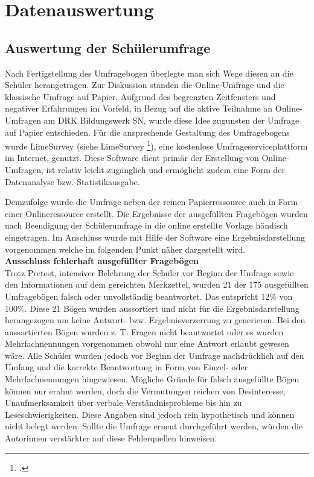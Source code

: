 \section{Datenauswertung}
\label{sec:Datenauswertung}

\subsection{Auswertung der Schülerumfrage}
\label{sec:AuswertungDerSchülerumfrage}

Nach Fertigstellung des Umfragebogen überlegte man sich Wege diesen an die Schüler herangetragen. Zur Diskussion standen die Online-Umfrage und die klassische Umfrage auf Papier. Aufgrund des begrenzten Zeitfensters und negativer Erfahrungen im Vorfeld, in Bezug auf die aktive Teilnahme an Online-Umfragen am DRK Bildungswerk SN, wurde diese Idee zugunsten der Umfrage auf Papier entschieden. Für die ansprechende Gestaltung des Umfragebogens wurde LimeSurvey (siehe LimeSurvey \footcite {LimeSurvey2015}), eine kostenlose Umfrageserviceplattform im Internet, genutzt. Diese Software dient primär der Erstellung von Online-Umfragen, ist relativ leicht zugänglich und ermöglicht zudem eine Form der Datenanalyse bzw. Statistikausgabe.

Demzufolge wurde die Umfrage neben der reinen Papierressource auch in Form einer Onlineressource erstellt. Die Ergebnisse der ausgefüllten Fragebögen wurden nach Beendigung der Schülerumfrage in die online erstellte Vorlage händisch eingetragen. Im Anschluss wurde mit Hilfe der Software eine Ergebnisdarstellung vorgenommen welche im folgenden Punkt näher dargestellt wird.\\

\noindent
\textbf{Ausschluss fehlerhaft ausgefüllter Fragebögen}\\

\noindent
Trotz Pretest, intensiver Belehrung der Schüler vor Beginn der Umfrage sowie den Informationen auf dem gereichten Merkzettel, wurden 21 der 175 ausgefüllten Umfragebögen falsch oder unvollständig beantwortet. Das entspricht 12\% von 100\%. Diese 21 Bögen wurden aussortiert und nicht für die Ergebnisdarstellung herangezogen um keine Antwort- bzw. Ergebnisverzerrung zu generieren. Bei den aussortierten Bögen wurden z. T. Fragen nicht beantwortet oder es wurden Mehrfachnennungen vorgenommen obwohl nur eine Antwort erlaubt gewesen wäre. Alle Schüler wurden jedoch vor Beginn der Umfrage nachdrücklich auf den Umfang und die korrekte Beantwortung in Form von Einzel- oder Mehrfachnennungen hingewiesen. Mögliche Gründe für falsch ausgefüllte Bögen können nur erahnt werden, doch die Vermutungen reichen von Desinteresse, Unaufmerksamkeit über verbale Verständnisprobleme bis hin zu Leseschwierigkeiten. Diese Angaben sind jedoch rein hypothetisch und können nicht belegt werden. Sollte die Umfrage erneut durchgeführt werden, würden die Autorinnen verstärkter auf diese Fehlerquellen hinweisen. 

